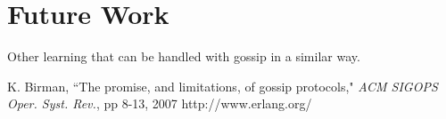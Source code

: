 \documentclass[11pt,twocolumn]{article}
\begin{document}
\section{Future Work}

Other learning that can be handled with gossip in a similar way.

\begin{thebibliography}{10}
K. Birman, ``The promise, and limitations, of gossip protocols," \emph{ACM SIGOPS Oper. Syst. Rev.}, pp 8-13, 2007
http://www.erlang.org/
\end{thebibliography}

\end{document}
